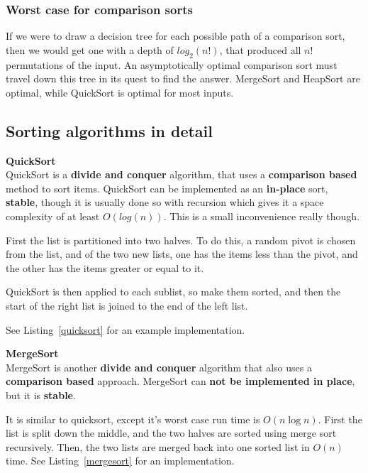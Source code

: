 \subsubsection{Worst case for comparison sorts}

If we were to draw a decision tree for each possible path of a comparison sort,
then we would get one with a depth of $log_2(n!)$, that produced all $n!$
permutations of the input. An asymptotically optimal comparison sort must travel
down this tree in its quest to find the answer. MergeSort and HeapSort are
optimal, while QuickSort is optimal for most inputs.

\subsection{Sorting algorithms in detail}
\begin{description}
\item \textbf{QuickSort} \\
  QuickSort is a \textbf{divide and conquer} algorithm, that uses a
  \textbf{comparison based} method to sort items. QuickSort can be implemented
  as an \textbf{in-place} sort, \textbf{stable}, though it is usually done so
  with recursion which gives it a space complexity of at least $O(log(n))$. This
  is a small inconvenience really though.

  First the list is partitioned into two halves. To do this, a random pivot is
  chosen from the list, and of the two new lists, one has the items less than
  the pivot, and the other has the items greater or equal to it.

  QuickSort is then applied to each sublist, so make them sorted, and then the
  start of the right list is joined to the end of the left list.

  See Listing~\ref{quicksort} for an example implementation.

\item \textbf{MergeSort} \\
  MergeSort is another \textbf{divide and conquer} algorithm that also uses a
  \textbf{comparison based} approach. MergeSort can \textbf{not be implemented
  in place}, but it is \textbf{stable}.

  It is similar to quicksort, except it's worst case run time is $O(n\log{n})$.
  First the list is split down the middle, and the two halves are sorted using
  merge sort recursively. Then, the two lists are merged back into one sorted
  list in $O(n)$ time. See Listing~\ref{mergesort} for an implementation.


\end{description}
